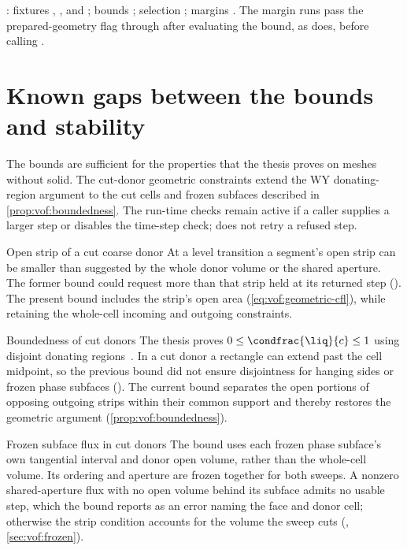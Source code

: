 \begin{implnote}
: fixtures
, ,
 and ; bounds
; selection ; margins
. The margin runs pass the prepared-geometry flag
through  after evaluating the
bound, as  does, before calling .
\end{implnote}

\section{Known gaps between the bounds and stability}\label{sec:stab:gaps}
The bounds are sufficient for the properties that the thesis proves on
meshes without solid. The cut-donor geometric constraints extend the WY
donating-region argument to the cut cells and frozen subfaces described in
\cref{prop:vof:boundedness}. The run-time checks remain active if a caller
supplies a larger step or disables the time-step check; 
does not retry a refused step.

\begin{deviation}{Open strip of a cut coarse donor}\label{dev:stab:strip}
At a level transition a segment's open strip can be smaller than suggested by
the whole donor volume or the shared aperture. The former bound could request
more than that strip held at its returned step (). The present
bound includes the strip's open area (\cref{eq:vof:geometric-cfl}), while
retaining the whole-cell incoming and outgoing constraints.
\end{deviation}

\begin{deviation}{Boundedness of cut donors}\label{dev:stab:boundedness}
The thesis proves $0\le\condfrac{\liq}{c}\le1$ using disjoint donating
regions~. In a cut donor a rectangle
can extend past the cell midpoint, so the previous bound did not ensure
disjointness for hanging sides or frozen phase subfaces ().
The current bound separates the open portions of opposing outgoing strips
within their common support and thereby restores the geometric argument
(\cref{prop:vof:boundedness}).
\end{deviation}

\begin{deviation}{Frozen subface flux in cut donors}\label{dev:stab:frozen-flux}
The bound uses each frozen phase subface's own tangential interval and
donor open volume, rather than the whole-cell volume. Its ordering and
aperture are frozen together for both sweeps. A nonzero shared-aperture
flux with no open volume behind its subface admits no usable step, which the
bound reports as an error naming the face and donor cell; otherwise the strip
condition accounts for the volume the sweep cuts
(, \cref{sec:vof:frozen}).
\end{deviation}

